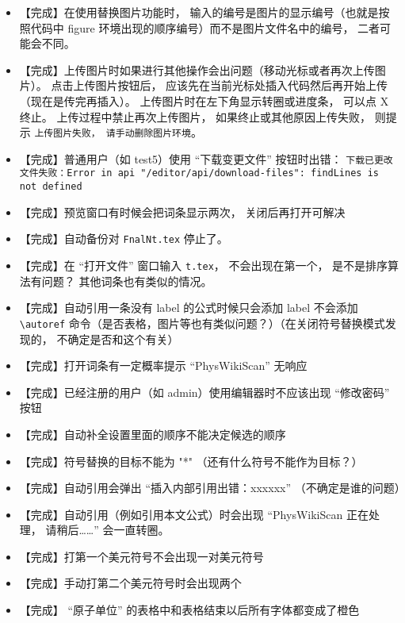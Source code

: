 \begin{itemize}
\item 【完成】在使用替换图片功能时， 输入的编号是图片的显示编号（也就是按照代码中 figure 环境出现的顺序编号）而不是图片文件名中的编号， 二者可能会不同。

\item 【完成】上传图片时如果进行其他操作会出问题（移动光标或者再次上传图片）。 点击上传图片按钮后， 应该先在当前光标处插入代码然后再开始上传（现在是传完再插入）。 上传图片时在左下角显示转圈或进度条， 可以点 X 终止。 上传过程中禁止再次上传图片， 如果终止或其他原因上传失败， 则提示 \verb|上传图片失败， 请手动删除图片环境|。

\item 【完成】普通用户（如 test5）使用 “下载变更文件” 按钮时出错： \verb|下载已更改文件失败：Error in api "/editor/api/download-files": findLines is not defined|

\item 【完成】预览窗口有时候会把词条显示两次， 关闭后再打开可解决

\item 【完成】自动备份对 \verb|FnalNt.tex| 停止了。

\item 【完成】在 “打开文件” 窗口输入 \lstinline|t.tex|， 不会出现在第一个， 是不是排序算法有问题？ 其他词条也有类似的情况。

\item 【完成】自动引用一条没有 label 的公式时候只会添加 label 不会添加 \lstinline|\autoref| 命令（是否表格，图片等也有类似问题？）（在关闭符号替换模式发现的， 不确定是否和这个有关）

\item 【完成】打开词条有一定概率提示 “PhysWikiScan” 无响应

\item 【完成】已经注册的用户（如 admin）使用编辑器时不应该出现 “修改密码” 按钮

\item 【完成】自动补全设置里面的顺序不能决定候选的顺序

\item 【完成】符号替换的目标不能为 "*" （还有什么符号不能作为目标？）

\item 【完成】自动引用会弹出 “插入内部引用出错：xxxxxx” （不确定是谁的问题）

\item 【完成】自动引用（例如引用本文公式）时会出现 “PhysWikiScan 正在处理， 请稍后……” 会一直转圈。

\item 【完成】打第一个美元符号不会出现一对美元符号

\item 【完成】手动打第二个美元符号时会出现两个

\item 【完成】 “原子单位” 的表格中和表格结束以后所有字体都变成了橙色
\end{itemize}

